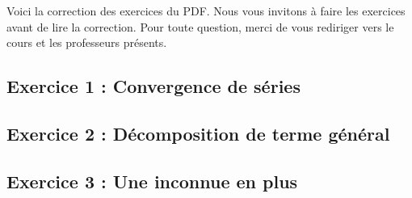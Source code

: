 \noindent Voici la correction des exercices du PDF. Nous vous invitons à faire les exercices avant de lire la correction. Pour toute question, merci de vous rediriger vers le cours et les professeurs présents.

\subsection{Exercice 1 : Convergence de séries}

\clearpage

\subsection{Exercice 2 : Décomposition de terme général}

\clearpage

\subsection{Exercice 3 : Une inconnue en plus}

\clearpage